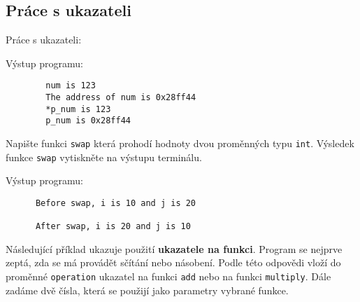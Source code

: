   \subsection{Práce s ukazateli}  

    \begin{example} Práce s ukazateli:\label{CPP:ex_pointer1}
    
    Výstup programu:
      \begin{verbatim}
        num is 123
        The address of num is 0x28ff44
        *p_num is 123
        p_num is 0x28ff44
        \end{verbatim}
    \end{example}
    
    \begin{example}\label{CPP:ex_swap} Napište funkci \texttt{swap} která prohodí hodnoty dvou proměnných typu \texttt{int}.
    Výsledek funkce \texttt{swap} vytiskněte na výstupu terminálu.
    
    Výstup programu:
      \begin{verbatim}
      Before swap, i is 10 and j is 20
      
      After swap, i is 20 and j is 10
      \end{verbatim}
    \end{example}
    
    \begin{example}\label{CPP:ex_scitej_nasob} Následující příklad ukazuje použití \textbf{ukazatele na funkci}. Program se
    nejprve zeptá, zda se má provádět sčítání nebo násobení. Podle této odpovědi vloží do proměnné \texttt{operation} ukazatel na
    funkci \texttt{add} nebo na funkci \texttt{multiply}. Dále zadáme dvě čísla, která se použijí jako parametry vybrané funkce.
    
    \end{example}             


